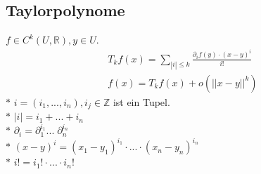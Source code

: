 \subsection{Taylorpolynome}
    \(f\in C^k(U,\mathbb R), y\in U\).\\
    \[\begin{array}{cc}
      T_kf(x)=\sum\limits_{|i|\leq k}\frac{\partial_if(y)\cdot(x-y)^i}{i!}\\
      f(x)=T_kf(x)+o(||x-y||^k)
    \end{array}\]
    \(*\) \(i=(i_1,...,i_n), i_j\in\mathbb Z\) ist ein Tupel.\\
    \(*\) \(|i| = i_1+...+i_n\)\\
    \(*\) \(\partial_i=\partial_1^{i_1}...\;\partial_n^{i_n}\)\\
    \(*\) \((x-y)^i=(x_1-y_1)^{i_1}\cdot...\cdot(x_n-y_n)^{i_n}\)\\
    \(*\) \(i!=i_1!\cdot...\cdot i_n!\)

